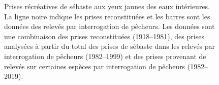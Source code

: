\documentclass[11pt]{book}
\begin{document}
\clearpage
\begin{figure}[htb]

{\centering {} 

}

\caption{Prises récréatives de sébaste aux yeux jaunes des eaux intérieures. La ligne noire indique les prises reconstituées et les barres sont les données des relevés par interrogation de pêcheurs. Les données sont une combinaison des prises reconstituées (1918--1981), des prises analysées à partir du total des prises de sébaste dans les relevés par interrogation de pêcheurs (1982--1999) et des prises provenant de relevés sur certaines espèces par interrogation de pêcheurs (1982--2019).}\label{fig:reccatch}
\end{figure}
\end{document}
